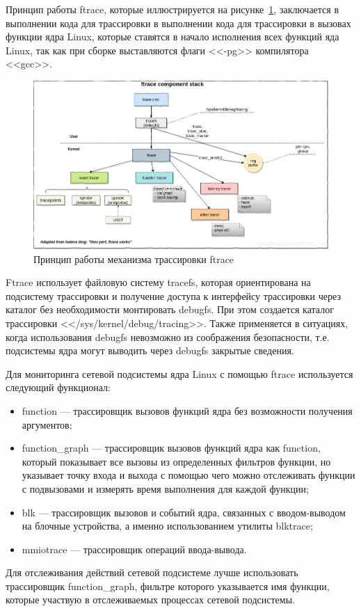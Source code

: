 Принцип работы ftrace, которые иллюстрируется на рисунке~\ref{img:ftrace_stack}, заключается в выполнении кода для трассировки в выполнении кода для трассировки в вызовах функции ядра Linux, которые ставятся в начало исполнения всех функций яда Linux, так как при сборке выставляются флаги <<-pg>> компилятора <<gcc>>.
 
\begin{figure}[h!]
	\centering
	\includegraphics[height=0.3\textheight]{img/ftrace_stack} %
	\caption{Принцип работы механизма трассировки ftrace}
	\label{img:ftrace_stack}
\end{figure}

Ftrace использует файловую систему tracefs, которая ориентирована на подсистему трассировки и получение доступа к интерфейсу трассировки через каталог без необходимости монтировать debugfs.
При этом создается каталог трассировки <</sys/kernel/debug/tracing>>. Также применяется в ситуациях, когда использования debugfs невозможно из соображения безопасности, т.е. подсистемы ядра могут выводить через debugfs закрытые сведения. 

Для мониторинга сетевой подсистемы ядра Linux с помощью ftrace используется следующий функционал:
\begin{itemize}
	\item function --- трассировщик вызовов функций ядра без возможности получения аргументов;
	\item function\_graph --- трассировщик вызовов функций ядра как function, который показывает все вызовы из определенных фильтров функции, но указывает точку входа и выхода с помощью чего можно отслеживать функции с подвызовами и измерять время выполнения для каждой функции;
	\item blk --- трассировщик вызовов и событий ядра, связанных с вводом-выводом на блочные устройства, а именно использованием утилиты blktrace;
	\item mmiotrace --- трассировщик операций ввода-вывода.
\end{itemize}
Для отслеживания действий сетевой подсистеме лучше использовать трассировщик function\_graph, фильтре которого указывается имя функции, которые участвую в отслеживаемых процессах сетевой подсистемы.   

